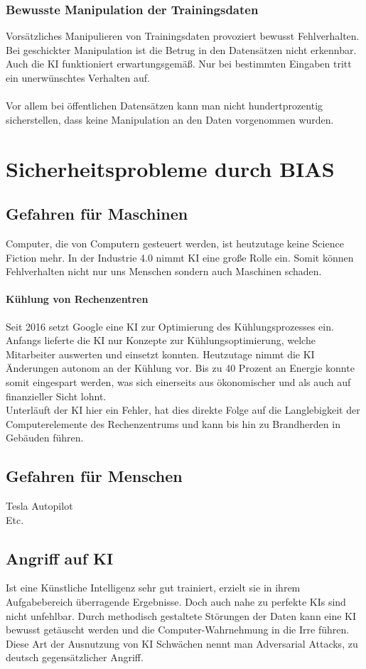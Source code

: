 \documentclass[12pt,oneside,a4paper,parskip]{scrbook}
\begin{document}
\subsection{Bewusste Manipulation der Trainingsdaten}
Vorsätzliches Manipulieren von Trainingsdaten provoziert bewusst Fehlverhalten. Bei geschickter Manipulation ist die Betrug in den Datensätzen nicht erkennbar. Auch die KI funktioniert erwartungsgemäß. Nur bei bestimmten Eingaben tritt ein unerwünschtes Verhalten auf. \\\\
Vor allem bei öffentlichen Datensätzen kann man nicht hundertprozentig sicherstellen, dass keine Manipulation an den Daten vorgenommen wurden.

\chapter{Sicherheitsprobleme durch BIAS}

\section{Gefahren für Maschinen}
Computer, die von Computern gesteuert werden, ist heutzutage keine Science Fiction mehr. In der Industrie 4.0 nimmt KI eine große Rolle ein. Somit können Fehlverhalten nicht nur uns Menschen sondern auch Maschinen schaden.
\subsubsection{Kühlung von Rechenzentren}
Seit 2016 setzt Google eine KI zur Optimierung des Kühlungsprozesses ein. Anfangs lieferte die KI nur Konzepte zur Kühlungsoptimierung, welche Mitarbeiter auswerten und einsetzt konnten. Heutzutage nimmt die KI Änderungen autonom an der Kühlung vor. Bis zu 40 Prozent an Energie konnte somit eingespart werden, was sich einerseits aus ökonomischer und als auch auf finanzieller Sicht lohnt.\\
Unterläuft der KI hier ein Fehler, hat dies direkte Folge auf die Langlebigkeit der Computerelemente des Rechenzentrums und kann bis hin zu Brandherden in Gebäuden führen.

\section{Gefahren für Menschen}
Tesla Autopilot
\\Etc.
\section{Angriff auf KI}
Ist eine Künstliche Intelligenz sehr gut trainiert, erzielt sie in ihrem Aufgabebereich überragende Ergebnisse. Doch auch nahe zu perfekte KIs sind nicht unfehlbar. Durch methodisch gestaltete Störungen der Daten kann eine KI bewusst getäuscht werden und die Computer-Wahrnehmung in die Irre führen. Diese Art der Ausnutzung von KI Schwächen nennt man Adversarial Attacks, zu deutsch gegensätzlicher Angriff.
\end{document}
